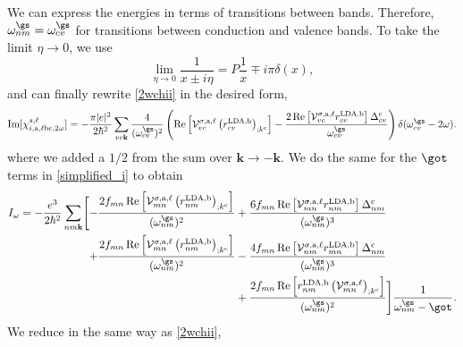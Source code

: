 We can express the energies in terms of transitions between bands. 
Therefore, $\omega^{\gs}_{nm} = \omega^{\gs}_{cv}$ for transitions between 
conduction and valence bands. To take the limit $\eta\to 0$, we use
\begin{equation}\label{limit_eta}
\lim_{\eta\to 0}\frac{1}{x\pm i\eta}=P\frac{1}{x}\mp i\pi\delta(x),
\end{equation}
and can finally rewrite \eqref{2wchii} in the desired form,
\begin{equation}\label{imchi2w}
    \mathrm{Im}[\chi_{i,\text{a},\ell\text{b}\text{c},2\omega}^{s,\ell}] 
=   -\frac{\pi \vert e\vert^{3}}{2\hbar^2}\sum_{vc\mathbf{k}}
    \frac{4}{(\omega^{\gs}_{cv})^{2}}\left(\mathrm{Re}
    \left[\mathcal{V}^{\sigma,\text{a},\ell}_{vc}
    \left(r^{\text{LDA,b}}_{cv}\right)_{;k^{\text{c}}}\right] 
-   \frac{2\,\mathrm{Re}\left[\mathcal{V}^{\sigma,\text{a},\ell}_{vc}
    r^{\text{LDA,b}}_{cv}\right]\Delta^{\text{c}}_{cv}}{\omega^{\gs}_{cv}}\right)
    \delta(\omega^{\gs}_{cv}-2\omega)
.
\end{equation}
where we added a $1/2$ from the sum over $\mathbf{k} \rightarrow - \mathbf{k}$.
We do the same for the $\got$ terms in \eqref{simplified_i} to obtain
\begin{align}\label{wchii}
I_{\omega}
= -\frac{e^3}{2\hbar^2}\sum_{nm\mathbf{k}}
\Biggl[
-   \frac{2f_{mn}\,\mathrm{Re}\left[\mathcal{V}^{\sigma,\text{a},\ell}_{mn}
    \left(r^{\text{LDA,b}}_{nm}\right)_{;k^{\text{c}}}\right]}
    {(\omega^{\gs}_{nm})^{2}}
&+  \frac{6f_{mn}\,\mathrm{Re}\left[\mathcal{V}^{\sigma,\text{a},\ell}_{mn}
    r^{\text{LDA,b}}_{nm}\right]\Delta^{\text{c}}_{nm}}{(\omega^{\gs}_{nm})^{3}}
    \nonumber\\
+   \frac{2f_{mn}\,\mathrm{Re}\left[\mathcal{V}^{\sigma,\text{a},\ell}_{mn}
    \left(r^{\text{LDA,b}}_{nm}\right)_{;k^{\text{c}}}\right]}
    {(\omega^{\gs}_{nm})^{2}}
&-  \frac{4f_{mn}\,\mathrm{Re}\left[\mathcal{V}^{\sigma,\text{a},\ell}_{nm}
    r^{\text{LDA,b}}_{mn}\right]\Delta_{nm}^{\text{c}}}{(\omega^{\gs}_{nm})^{3}}
    \nonumber\\
&+  \frac{2f_{mn}\,\mathrm{Re}\left[r^{\text{LDA,b}}_{nm}
    \left(\mathcal{V}^{\sigma,\text{a},\ell}_{mn}\right)
    _{;k^{\text{c}}}\right]}{(\omega^{\gs}_{nm})^{2}}
\Biggr]\frac{1}{\omega^{\gs}_{nm}-\got}
.
\end{align}
We reduce in the same way as \eqref{2wchii}, 
